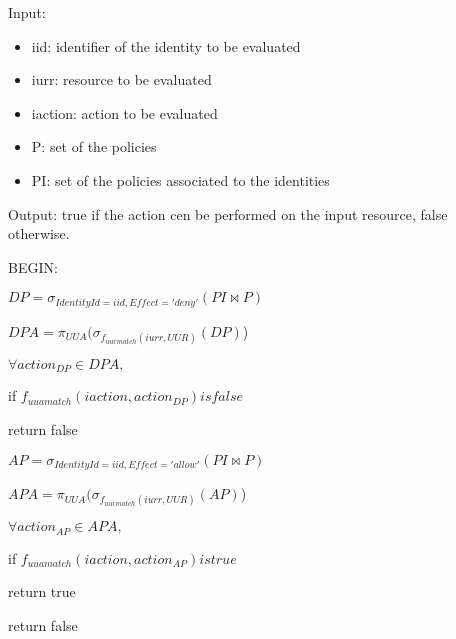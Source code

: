 \begin{boxF}
    \begin{definition}
        Input:
        \begin{itemize}
            \item iid: identifier of the identity to be evaluated
            \item iurr: resource to be evaluated
            \item iaction: action to be evaluated
            \item P: set of the policies
            \item PI: set of the policies associated to the identities
        \end{itemize}
        Output: true if the action cen be performed on the input resource, false otherwise.

        BEGIN:
            
        \hspace{2pt} $DP = \sigma_{IdentityId=iid, Effect='deny'}(PI \bowtie P)$
        
        \hspace{2pt} $DPA = \pi_{UUA}(\sigma_{f_{uurmatch}(iurr, UUR)}(DP)$)

        \hspace{2pt} $\forall action_{DP} \in DPA,$
            
        \hspace{10pt} if $f_{uuamatch}(iaction, action_{DP}) is false $ 
        
        \hspace{20pt} return false
        \vspace{10pt}
        
        \hspace{2pt} $AP = \sigma_{IdentityId=iid, Effect='allow'}(PI \bowtie P)$

        \hspace{2pt} $APA = \pi_{UUA}(\sigma_{f_{uurmatch}(iurr, UUR)}(AP)$)

        \hspace{2pt} $\forall action_{AP} \in APA,$
            
        \hspace{10pt} if $f_{uuamatch}(iaction, action_{AP}) is true $ 
        
        \hspace{20pt} return true
        \vspace{10pt}

        \hspace{2pt} return false
        \label{definition:policy-evaluation}
    \end{definition}
\end{boxF}


